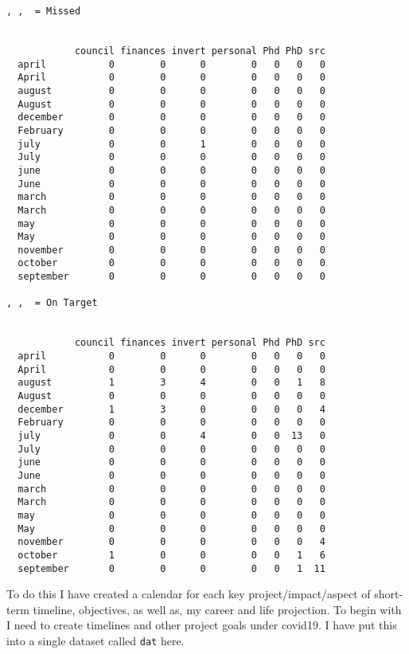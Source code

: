 \begin{verbatim}
, ,  = Missed

           
            council finances invert personal Phd PhD src
  april           0        0      0        0   0   0   0
  April           0        0      0        0   0   0   0
  august          0        0      0        0   0   0   0
  August          0        0      0        0   0   0   0
  december        0        0      0        0   0   0   0
  February        0        0      0        0   0   0   0
  july            0        0      1        0   0   0   0
  July            0        0      0        0   0   0   0
  june            0        0      0        0   0   0   0
  June            0        0      0        0   0   0   0
  march           0        0      0        0   0   0   0
  March           0        0      0        0   0   0   0
  may             0        0      0        0   0   0   0
  May             0        0      0        0   0   0   0
  november        0        0      0        0   0   0   0
  october         0        0      0        0   0   0   0
  september       0        0      0        0   0   0   0

, ,  = On Target

           
            council finances invert personal Phd PhD src
  april           0        0      0        0   0   0   0
  April           0        0      0        0   0   0   0
  august          1        3      4        0   0   1   8
  August          0        0      0        0   0   0   0
  december        1        3      0        0   0   0   4
  February        0        0      0        0   0   0   0
  july            0        0      4        0   0  13   0
  July            0        0      0        0   0   0   0
  june            0        0      0        0   0   0   0
  June            0        0      0        0   0   0   0
  march           0        0      0        0   0   0   0
  March           0        0      0        0   0   0   0
  may             0        0      0        0   0   0   0
  May             0        0      0        0   0   0   0
  november        0        0      0        0   0   0   4
  october         1        0      0        0   0   1   6
  september       0        0      0        0   0   1  11
\end{verbatim}
To do this I have created a calendar for each key project/impact/aspect of short-term timeline, objectives, as well as, my career and life projection. To begin with I need to create timelines and other project goals under covid19. I have put this into a single dataset called \texttt{dat} here.

